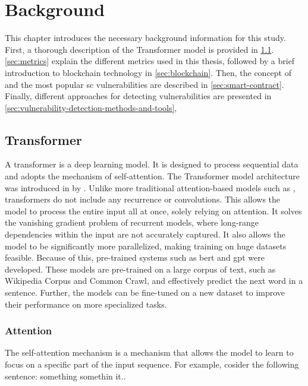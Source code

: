 \chapter{Background}
\label{chap:background}
This chapter introduces the necessary background information for this study. First, a thorough description of the Transformer model is provided in \cref{sec:transformer}. \cref{sec:metrics} explain the different metrics used in this thesis, followed by a brief introduction to blockchain technology in \cref{sec:blockchain}. Then, the concept of  and the most popular \acrshort{sc} vulnerabilities are described in \cref{sec:smart-contract}. Finally, different approaches for detecting vulnerabilities are presented in \cref{sec:vulnerability-detection-methods-and-tools}, 

\section{Transformer}
\label{sec:transformer}
A transformer is a deep learning model. It is designed to process sequential data and adopts the mechanism of self-attention. The Transformer model architecture was introduced in \citeyear{vaswani2017attention} by \textcite{vaswani2017attention}. Unlike more traditional attention-based models such as , transformers do not include any recurrence or convolutions. This allows the model to process the entire input all at once, solely relying on attention. It solves the vanishing gradient problem of recurrent models, where long-range dependencies within the input are not accurately captured. It also allows the model to be significantly more parallelized, making training on huge datasets feasible. Because of this, pre-trained systems such as \acrfull{bert} \cite{devlin2018bert} and \acrshort{gpt} \cite{radford2018improving} were developed. These models are pre-trained on a large corpus of text, such as Wikipedia Corpus and Common Crawl, and effectively predict the next word in a sentence. Further, the models can be fine-tuned on a new dataset to improve their performance on more specialized tasks.

\subsection{Attention}
The self-attention mechanism is a mechanism that allows the model to learn to focus on a specific part of the input sequence. For example, cosider the following sentence: 
something somethin it..

